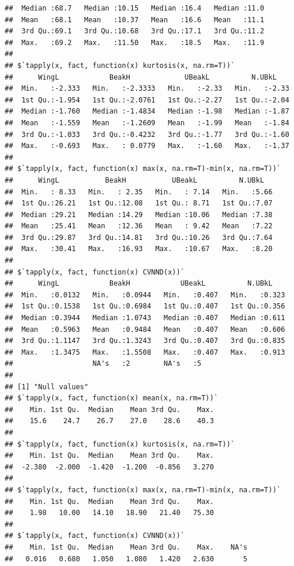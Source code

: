 \documentclass[12pt]{article}\usepackage[]{graphicx}\usepackage[]{color}
\makeatletter
\newenvironment{kframe}{%
 \def\at@end@of@kframe{}%
 \ifinner\ifhmode%
  \def\at@end@of@kframe{\end{minipage}}%
  \begin{minipage}{\columnwidth}%
 \fi\fi%
 \def\FrameCommand##1{\hskip\@totalleftmargin \hskip-\fboxsep
 \colorbox{shadecolor}{##1}\hskip-\fboxsep
     \hskip-\linewidth \hskip-\@totalleftmargin \hskip\columnwidth}%
 \MakeFramed {\advance\hsize-\width
   \@totalleftmargin\z@ \linewidth\hsize
   \@setminipage}}%
 {\par\unskip\endMakeFramed%
 \at@end@of@kframe}
\newenvironment{knitrout}{}{} %
\makeatother
\begin{document}
\begin{knitrout}
\begin{kframe}
\begin{verbatim}
##  Median :68.7   Median :10.15   Median :16.4   Median :11.0  
##  Mean   :68.1   Mean   :10.37   Mean   :16.6   Mean   :11.1  
##  3rd Qu.:69.1   3rd Qu.:10.68   3rd Qu.:17.1   3rd Qu.:11.2  
##  Max.   :69.2   Max.   :11.50   Max.   :18.5   Max.   :11.9  
## 
## $`tapply(x, fact, function(x) kurtosis(x, na.rm=T))`
##      WingL            BeakH             UBeakL          N.UBkL     
##  Min.   :-2.333   Min.   :-2.3333   Min.   :-2.33   Min.   :-2.33  
##  1st Qu.:-1.954   1st Qu.:-2.0761   1st Qu.:-2.27   1st Qu.:-2.04  
##  Median :-1.760   Median :-1.4834   Median :-1.98   Median :-1.87  
##  Mean   :-1.559   Mean   :-1.2609   Mean   :-1.99   Mean   :-1.84  
##  3rd Qu.:-1.033   3rd Qu.:-0.4232   3rd Qu.:-1.77   3rd Qu.:-1.60  
##  Max.   :-0.693   Max.   : 0.0779   Max.   :-1.60   Max.   :-1.37  
## 
## $`tapply(x, fact, function(x) max(x, na.rm=T)-min(x, na.rm=T))`
##      WingL           BeakH           UBeakL          N.UBkL    
##  Min.   : 8.33   Min.   : 2.35   Min.   : 7.14   Min.   :5.66  
##  1st Qu.:26.21   1st Qu.:12.08   1st Qu.: 8.71   1st Qu.:7.07  
##  Median :29.21   Median :14.29   Median :10.06   Median :7.38  
##  Mean   :25.41   Mean   :12.36   Mean   : 9.42   Mean   :7.22  
##  3rd Qu.:29.87   3rd Qu.:14.81   3rd Qu.:10.26   3rd Qu.:7.64  
##  Max.   :30.41   Max.   :16.93   Max.   :10.67   Max.   :8.20  
## 
## $`tapply(x, fact, function(x) CVNND(x))`
##      WingL            BeakH            UBeakL          N.UBkL     
##  Min.   :0.0132   Min.   :0.0944   Min.   :0.407   Min.   :0.323  
##  1st Qu.:0.1538   1st Qu.:0.6984   1st Qu.:0.407   1st Qu.:0.356  
##  Median :0.3944   Median :1.0743   Median :0.407   Median :0.611  
##  Mean   :0.5963   Mean   :0.9484   Mean   :0.407   Mean   :0.606  
##  3rd Qu.:1.1147   3rd Qu.:1.3243   3rd Qu.:0.407   3rd Qu.:0.835  
##  Max.   :1.3475   Max.   :1.5508   Max.   :0.407   Max.   :0.913  
##                   NA's   :2        NA's   :5                      
## 
## [1] "Null values"
## $`tapply(x, fact, function(x) mean(x, na.rm=T))`
##    Min. 1st Qu.  Median    Mean 3rd Qu.    Max. 
##    15.6    24.7    26.7    27.0    28.6    40.3 
## 
## $`tapply(x, fact, function(x) kurtosis(x, na.rm=T))`
##    Min. 1st Qu.  Median    Mean 3rd Qu.    Max. 
##  -2.380  -2.000  -1.420  -1.200  -0.856   3.270 
## 
## $`tapply(x, fact, function(x) max(x, na.rm=T)-min(x, na.rm=T))`
##    Min. 1st Qu.  Median    Mean 3rd Qu.    Max. 
##    1.98   10.00   14.10   18.90   21.40   75.30 
## 
## $`tapply(x, fact, function(x) CVNND(x))`
##    Min. 1st Qu.  Median    Mean 3rd Qu.    Max.    NA's 
##   0.016   0.680   1.050   1.080   1.420   2.630       5

\end{verbatim}
\end{kframe}
\end{knitrout}
\end{document}
